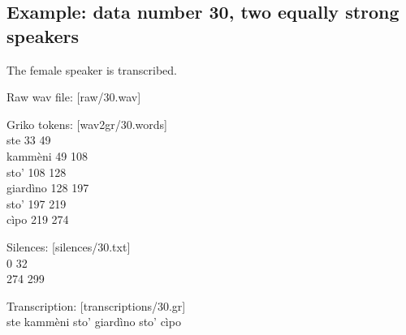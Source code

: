 \documentclass{article}
\begin{document}

\subsection{Example: data number 30, two equally strong speakers}
	
	The female speaker is transcribed.
	
	Raw wav file: [raw/30.wav]
	
	Griko tokens: [wav2gr/30.words] \\
		ste 33 49 \\
		kamm\`{e}ni 49 108 \\
		sto' 108 128 \\
		giard\`{i}no 128 197 \\
		sto' 197 219 \\
		c\`{i}po 219 274

	Silences: [silences/30.txt] \\
		0 32 \\
		274 299

	Transcription: [transcriptions/30.gr] \\
		ste kamm\`{e}ni sto' giard\`{i}no sto' c\`{i}po












\end{document}
